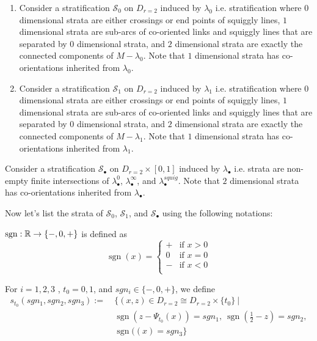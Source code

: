 \begin{definition}
\begin{enumerate}
\item Consider a stratification $\mathcal{S}_0$ on $D_{r=2}$ induced by $\lambda_0$ i.e. stratification where $0$ dimensional strata are either crossings or end points of squiggly lines, $1$ dimensional strata are sub-arcs of co-oriented links and squiggly lines that are separated by $0$ dimensional strata, and $2$ dimensional strata are exactly the connected components of $M-\lambda_0$. Note that $1$ dimensional strata has co-orientations inherited from $\lambda_0$.

\item Consider a stratification $\mathcal{S}_1$ on $D_{r=2}$ induced by $\lambda_1$ i.e. stratification where $0$ dimensional strata are either crossings or end points of squiggly lines, $1$ dimensional strata are sub-arcs of co-oriented links and squiggly lines that are separated by $0$ dimensional strata, and $2$ dimensional strata are exactly the connected components of $M-\lambda_1$. Note that $1$ dimensional strata has co-orientations inherited from $\lambda_1$.
\end{enumerate}

\item Consider a stratification $\mathcal{S}_\bullet$ on $D_{r=2}\times [0,1]$ induced by $\lambda_\bullet$ i.e. strata are non-empty finite intersections of $\lambda_\bullet^0$, $\lambda_\bullet^\infty$, and $\lambda_\bullet^{squig}$. Note that $2$ dimensional strata has co-orientations inherited from $\lambda_\bullet$.
\end{definition}

Now let's list the strata of $\mathcal{S}_0$, $\mathcal{S}_1$, and $\mathcal{S}_\bullet$ using the following notations:
\begin{definition}
$\operatorname{sgn} : \mathbb{R} \rightarrow \{-,0,+ \}$ is defined as 
\[\operatorname{sgn}(x)=\left\{
\begin{array}{ll}
    + & \text{if } x > 0 \\
    0 & \text{if } x = 0 \\
	- & \text{if } x < 0 \\
\end{array}
\right.
\]
\end{definition}

\begin{definition}
For $i = 1,2,3$ , $t_0 = 0,1$, and $sgn_i \in \{-,0,+\}$, we define
\begin{align*}
s_{t_0}(sgn_1,sgn_2,sgn_3):=~ &\{(x,z) \in D_{r=2}\cong D_{r=2}\times \{t_0\} ~| \\
&\operatorname{sgn}(z-\Psi_{t_0}(x))=sgn_1,~ \operatorname{sgn}(\frac{1}{2}-z)=sgn_2,\\ 
&\operatorname{sgn}((x)=sgn_3\}
\end{align*}
\end{definition}


